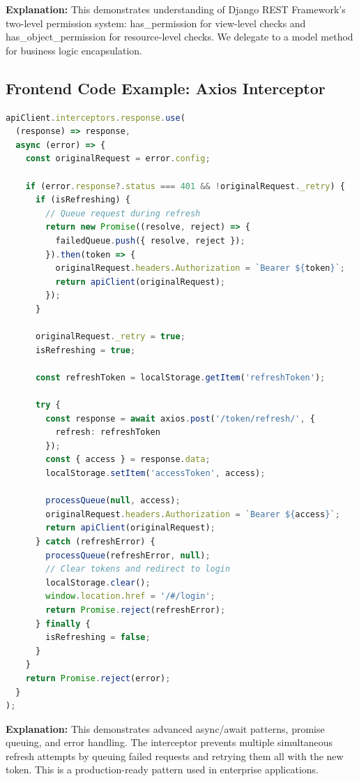 \documentclass[11pt,a4paper]{article}
\begin{document}
\textbf{Explanation:} This demonstrates understanding of Django REST Framework's two-level permission system: has\_permission for view-level checks and has\_object\_permission for resource-level checks. We delegate to a model method for business logic encapsulation.

\subsection{Frontend Code Example: Axios Interceptor}
\begin{lstlisting}[language=TypeScript]
apiClient.interceptors.response.use(
  (response) => response,
  async (error) => {
    const originalRequest = error.config;

    if (error.response?.status === 401 && !originalRequest._retry) {
      if (isRefreshing) {
        // Queue request during refresh
        return new Promise((resolve, reject) => {
          failedQueue.push({ resolve, reject });
        }).then(token => {
          originalRequest.headers.Authorization = `Bearer ${token}`;
          return apiClient(originalRequest);
        });
      }

      originalRequest._retry = true;
      isRefreshing = true;

      const refreshToken = localStorage.getItem('refreshToken');
      
      try {
        const response = await axios.post('/token/refresh/', {
          refresh: refreshToken
        });
        const { access } = response.data;
        localStorage.setItem('accessToken', access);
        
        processQueue(null, access);
        originalRequest.headers.Authorization = `Bearer ${access}`;
        return apiClient(originalRequest);
      } catch (refreshError) {
        processQueue(refreshError, null);
        // Clear tokens and redirect to login
        localStorage.clear();
        window.location.href = '/#/login';
        return Promise.reject(refreshError);
      } finally {
        isRefreshing = false;
      }
    }
    return Promise.reject(error);
  }
);
\end{lstlisting}

\textbf{Explanation:} This demonstrates advanced async/await patterns, promise queuing, and error handling. The interceptor prevents multiple simultaneous refresh attempts by queuing failed requests and retrying them all with the new token. This is a production-ready pattern used in enterprise applications.
\end{document}
